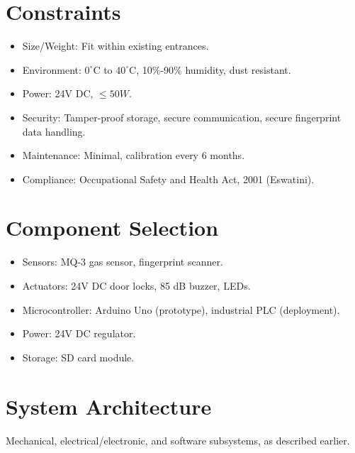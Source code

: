 \documentclass[a4paper,12pt]{article}
\begin{document}
\section{Constraints}
\begin{itemize}
    \item Size/Weight: Fit within existing entrances.
    \item Environment: $0^\circ$C to $40^\circ$C, 10\%-90\% humidity, dust resistant.
    \item Power: 24V DC, $\leq 50W$.
    \item Security: Tamper-proof storage, secure communication, secure fingerprint data handling.
    \item Maintenance: Minimal, calibration every 6 months.
    \item Compliance: Occupational Safety and Health Act, 2001 (Eswatini).
\end{itemize}

\section{Component Selection}
\begin{itemize}
    \item Sensors: MQ-3 gas sensor, fingerprint scanner.
    \item Actuators: 24V DC door locks, 85 dB buzzer, LEDs.
    \item Microcontroller: Arduino Uno (prototype), industrial PLC (deployment).
    \item Power: 24V DC regulator.
    \item Storage: SD card module.
\end{itemize}

\section{System Architecture}
Mechanical, electrical/electronic, and software subsystems, as described earlier.
\end{document}
